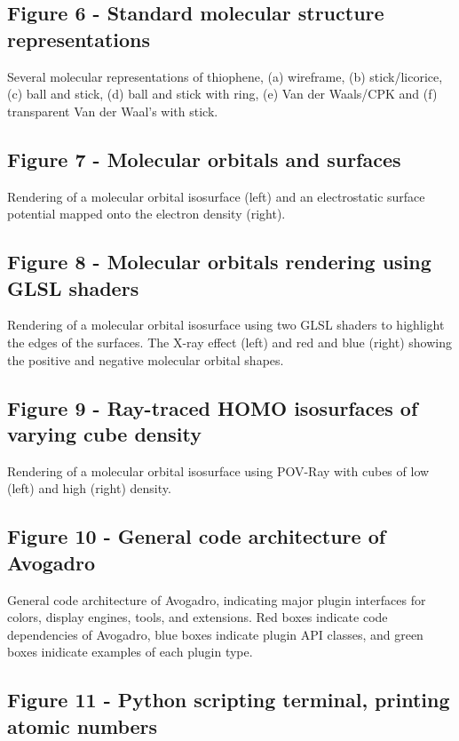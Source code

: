 \documentclass[10pt]{bmc_article}
\newenvironment{bmcformat}{\begin{raggedright}
  \baselineskip20pt\sloppy\setboolean{publ}{false}}{\end{raggedright}
  \baselineskip20pt\sloppy}
\begin{document}
\begin{bmcformat}
  \subsection*{Figure 6 - Standard molecular structure representations}
    Several molecular representations of thiophene, (a) wireframe,
    (b) stick/licorice, (c) ball and stick, (d) ball and stick with ring,
    (e) Van der Waals/CPK and (f) transparent Van der Waal's with stick.

  \subsection*{Figure 7 - Molecular orbitals and surfaces}
    Rendering of a molecular orbital isosurface (left) and an electrostatic
    surface potential mapped onto the electron density (right).

  \subsection*{Figure 8 - Molecular orbitals rendering using GLSL shaders}
    Rendering of a molecular orbital isosurface using two GLSL shaders to
    highlight the edges of the surfaces. The X-ray effect (left) and red and blue (right)
    showing the positive and negative molecular orbital shapes.

  \subsection*{Figure 9 - Ray-traced HOMO isosurfaces of varying cube density}
    Rendering of a molecular orbital isosurface using POV-Ray with cubes
    of low (left) and high (right) density.

  \subsection*{Figure 10 - General code architecture of Avogadro}
    General code architecture of Avogadro, indicating major
    plugin interfaces for colors, display engines, tools, and
    extensions. Red boxes indicate code dependencies of Avogadro, blue
    boxes indicate plugin API classes, and green boxes inidicate examples of
    each plugin type.

  \subsection*{Figure 11 - Python scripting terminal, printing atomic numbers}


\end{bmcformat}
\end{document}
